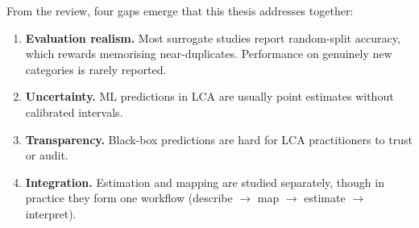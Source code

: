 From the review, four gaps emerge that this thesis addresses together:
\begin{enumerate}
  \item \textbf{Evaluation realism.} Most surrogate studies report random-split accuracy, which
  rewards memorising near-duplicates. Performance on genuinely new categories is rarely reported.
  \item \textbf{Uncertainty.} ML predictions in LCA are usually point estimates without calibrated
  intervals.
  \item \textbf{Transparency.} Black-box predictions are hard for LCA practitioners to trust or audit.
  \item \textbf{Integration.} Estimation and mapping are studied separately, though in practice
  they form one workflow (describe $\rightarrow$ map $\rightarrow$ estimate $\rightarrow$
  interpret).
\end{enumerate}
